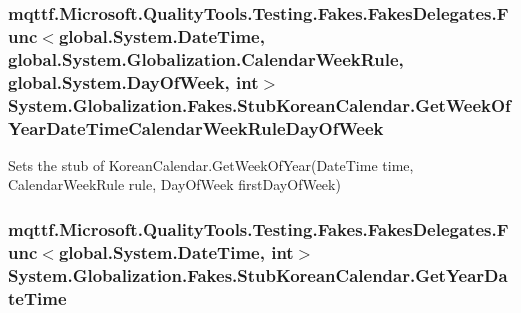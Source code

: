 \hypertarget{class_system_1_1_globalization_1_1_fakes_1_1_stub_korean_calendar_a19137b8a20df4160b3ada439838f169c}{
\subsubsection[{Get\-Week\-Of\-Year\-Date\-Time\-Calendar\-Week\-Rule\-Day\-Of\-Week}]{\setlength{\rightskip}{0pt plus 5cm}mqttf.\-Microsoft.\-Quality\-Tools.\-Testing.\-Fakes.\-Fakes\-Delegates.\-Func$<$global.\-System.\-Date\-Time, global.\-System.\-Globalization.\-Calendar\-Week\-Rule, global.\-System.\-Day\-Of\-Week, int$>$ System.\-Globalization.\-Fakes.\-Stub\-Korean\-Calendar.\-Get\-Week\-Of\-Year\-Date\-Time\-Calendar\-Week\-Rule\-Day\-Of\-Week}}\label{class_system_1_1_globalization_1_1_fakes_1_1_stub_korean_calendar_a19137b8a20df4160b3ada439838f169c}


Sets the stub of Korean\-Calendar.\-Get\-Week\-Of\-Year(\-Date\-Time time, Calendar\-Week\-Rule rule, Day\-Of\-Week first\-Day\-Of\-Week)

\hypertarget{class_system_1_1_globalization_1_1_fakes_1_1_stub_korean_calendar_a9571fde9b6e0c267a7cc9726dab30478}{
\subsubsection[{Get\-Year\-Date\-Time}]{\setlength{\rightskip}{0pt plus 5cm}mqttf.\-Microsoft.\-Quality\-Tools.\-Testing.\-Fakes.\-Fakes\-Delegates.\-Func$<$global.\-System.\-Date\-Time, int$>$ System.\-Globalization.\-Fakes.\-Stub\-Korean\-Calendar.\-Get\-Year\-Date\-Time}}\label{class_system_1_1_globalization_1_1_fakes_1_1_stub_korean_calendar_a9571fde9b6e0c267a7cc9726dab30478}



